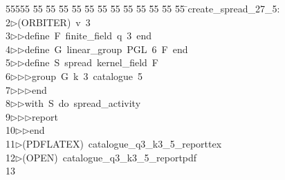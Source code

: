 %
%
\begin{tabbing}
55555 \= 55 \= 55 \= 55 \= 55 \= 55 \= 55 \= 55 \= 55 \= 55 \= 55 \= 55 \= 55 \= \>create\_spread\_27\_5:\\[0pt]
2\>$\triangleright$\>(ORBITER)\ v\ 3\ \\[0pt]
3\>$\triangleright$\>$\triangleright$\>define\ F\ finite\_field\ q\ 3\ end\ \\[0pt]
4\>$\triangleright$\>$\triangleright$\>define\ G\ linear\_group\ PGL\ 6\ F\ end\ \\[0pt]
5\>$\triangleright$\>$\triangleright$\>define\ S\ spread\ kernel\_field\ F\ \\[0pt]
6\>$\triangleright$\>$\triangleright$\>$\triangleright$\>group\ G\ k\ 3\ catalogue\ 5\ \\[0pt]
7\>$\triangleright$\>$\triangleright$\>$\triangleright$\>end\ \\[0pt]
8\>$\triangleright$\>$\triangleright$\>with\ S\ do\ spread\_activity\ \\[0pt]
9\>$\triangleright$\>$\triangleright$\>$\triangleright$\>report\ \\[0pt]
10\>$\triangleright$\>$\triangleright$\>end\\[0pt]
11\>$\triangleright$\>(PDFLATEX)\ catalogue\_q3\_k3\_5\_reporttex\\[0pt]
12\>$\triangleright$\>(OPEN)\ catalogue\_q3\_k3\_5\_reportpdf\\[0pt]
13\>\end{tabbing}
